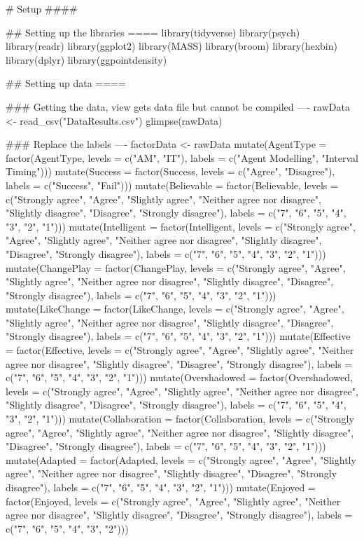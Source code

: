 \documentclass{IEEEtran}
\begin{document}
\begin{verbnobox}[\fontsize{10pt}{10pt}\selectfont]
# Setup ####

## Setting up the libraries ====
library(tidyverse)
library(psych)
library(readr)
library(ggplot2)
library(MASS)
library(broom)
library(hexbin)
library(dplyr)
library(ggpointdensity)

## Setting up data ====

### Getting the data, view gets data file but cannot be compiled ----
rawData <- read_csv("DataResults.csv")
glimpse(rawData)

### Replace the labels ----
factorData <- rawData %
  mutate(AgentType = factor(AgentType, levels = c("AM", "IT"),
                            labels = c("Agent Modelling", "Interval Timing"))) %
  mutate(Success = factor(Success, levels = c("Agree", "Disagree"),
                            labels = c("Success", "Fail"))) %
  mutate(Believable = factor(Believable, levels = c("Strongly agree", "Agree", "Slightly 
  agree",  "Neither agree nor disagree", "Slightly disagree", "Disagree", "Strongly disagree"),
                            labels = c("7", "6", "5", "4", "3", "2", "1"))) %
  mutate(Intelligent = factor(Intelligent, levels = c("Strongly agree", "Agree", "Slightly 
  agree",  "Neither agree nor disagree", "Slightly disagree", "Disagree", "Strongly disagree"),
                               labels = c("7", "6", "5", "4", "3", "2", "1"))) %
  mutate(ChangePlay = factor(ChangePlay, levels = c("Strongly agree", "Agree", "Slightly 
  agree",  "Neither agree nor disagree", "Slightly disagree", "Disagree", "Strongly disagree"),
                                labels = c("7", "6", "5", "4", "3", "2", "1"))) %
  mutate(LikeChange = factor(LikeChange, levels = c("Strongly agree", "Agree", "Slightly 
  agree", "Neither agree nor disagree", "Slightly disagree", "Disagree", "Strongly disagree"),
                               labels = c("7", "6", "5", "4", "3", "2", "1"))) %
  mutate(Effective = factor(Effective, levels = c("Strongly agree", "Agree", "Slightly agree", 
  "Neither agree nor disagree", "Slightly disagree", "Disagree", "Strongly disagree"),
                               labels = c("7", "6", "5", "4", "3", "2", "1"))) %
  mutate(Overshadowed = factor(Overshadowed, levels = c("Strongly agree", "Agree", "Slightly 
  agree", "Neither agree nor disagree", "Slightly disagree", "Disagree", "Strongly disagree"),
                              labels = c("7", "6", "5", "4", "3", "2", "1"))) %
  mutate(Collaboration = factor(Collaboration, levels = c("Strongly agree", "Agree", "Slightly 
  agree", "Neither agree nor disagree", "Slightly disagree", "Disagree", "Strongly disagree"),
                            labels = c("7", "6", "5", "4", "3", "2", "1"))) %
  mutate(Adapted = factor(Adapted, levels = c("Strongly agree", "Agree", "Slightly agree", 
  "Neither agree nor disagree", "Slightly disagree", "Disagree", "Strongly disagree"),
                                 labels = c("7", "6", "5", "4", "3", "2", "1"))) %
  mutate(Enjoyed = factor(Enjoyed, levels = c("Strongly agree", "Agree", "Slightly agree", 
  "Neither agree nor disagree", "Slightly disagree", "Disagree", "Strongly disagree"),
                            labels = c("7", "6", "5", "4", "3", "2")))


\end{verbnobox}
\end{document}
